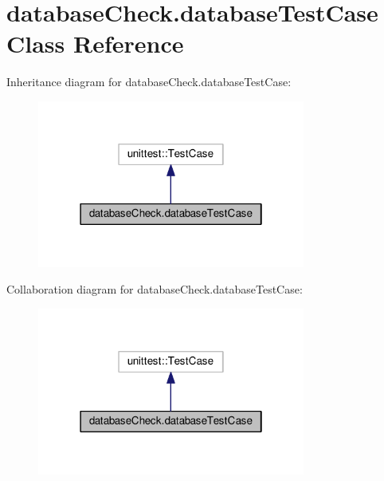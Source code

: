 \hypertarget{classdatabaseCheck_1_1databaseTestCase}{}\section{database\+Check.\+database\+Test\+Case Class Reference}
\label{classdatabaseCheck_1_1databaseTestCase}


Inheritance diagram for database\+Check.\+database\+Test\+Case\+:\nopagebreak
\begin{figure}[H]
\begin{center}
\leavevmode
\includegraphics[width=250pt]{classdatabaseCheck_1_1databaseTestCase__inherit__graph}
\end{center}
\end{figure}


Collaboration diagram for database\+Check.\+database\+Test\+Case\+:\nopagebreak
\begin{figure}[H]
\begin{center}
\leavevmode
\includegraphics[width=250pt]{classdatabaseCheck_1_1databaseTestCase__coll__graph}
\end{center}
\end{figure}
